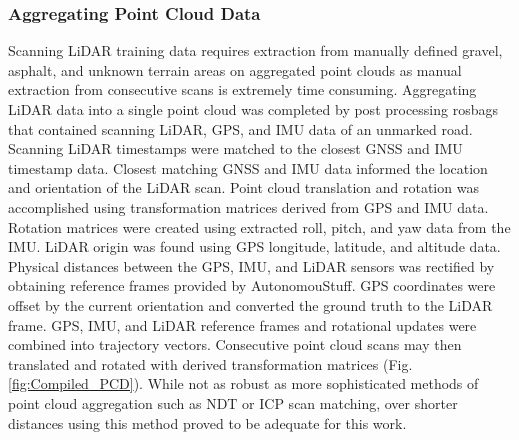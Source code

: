 \documentclass[numbered,pdftex]{ohio-etd}
\begin{document}
{{{%
%				
%			
%			

			\subsubsection{Aggregating Point Cloud Data}\label{sec:aggregating_point_cloud_data}{
			
				{Scanning LiDAR training data requires extraction from manually defined gravel, asphalt, and unknown terrain areas on aggregated point clouds as manual extraction from consecutive scans is extremely time consuming. Aggregating LiDAR data into a single point cloud was completed by post processing rosbags that contained scanning LiDAR, GPS, and IMU data of an unmarked road. Scanning LiDAR timestamps were matched to the closest GNSS and IMU timestamp data. Closest matching GNSS and IMU data informed the location and orientation of the LiDAR scan. Point cloud translation and rotation was accomplished using transformation matrices derived from GPS and IMU data. Rotation matrices were created using extracted roll, pitch, and yaw data from the IMU. LiDAR origin was found using GPS longitude, latitude, and altitude data. Physical distances between the GPS, IMU, and LiDAR sensors was rectified by obtaining reference frames provided by AutonomouStuff. GPS coordinates were offset by the current orientation and converted the ground truth to the LiDAR frame. GPS, IMU, and LiDAR reference frames and rotational updates were combined into trajectory vectors. Consecutive point cloud scans may then translated and rotated with derived transformation matrices (Fig. \ref{fig:Compiled_PCD}). While not as robust as more sophisticated methods of point cloud aggregation such as NDT or ICP scan matching, over shorter distances using this method proved to be adequate for this work.} 
				
}}}}
\end{document}
